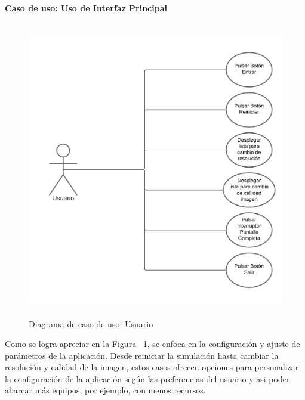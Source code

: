 \textbf{Caso de uso: Uso de Interfaz Principal}
\begin{figure}[h]
\centering
\includegraphics[width=13cm, height=13cm]{figures/cuui.png}
\caption{Diagrama de caso de uso: Usuario}
\label{fig:cuui}
\end{figure}

Como se logra apreciar en la Figura ~\ref{fig:cuui}, se enfoca en la configuración y ajuste de parámetros de la aplicación. Desde reiniciar la simulación hasta cambiar la resolución y calidad de la imagen, estos casos ofrecen opciones para personalizar la configuración de la aplicación según las preferencias del usuario y asi poder abarcar más equipos, por ejemplo, con menos recursos.


